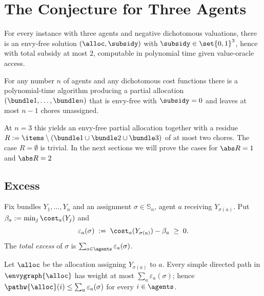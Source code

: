\section{The Conjecture for Three Agents}
\label{sec:n3}


\begin{theorem}
\label{thm:n3-main}
For every instance with three agents and negative dichotomous valuations, there
is an envy-free solution $(\alloc, \subsidy)$ with $\subsidy \in \set{0,1}^3$,
hence with total subsidy at most $2$, computable in polynomial time given
value-oracle access.
\end{theorem}


\begin{theorem}
\label{thm:n3-twyz}
For any number $n$ of agents and any dichotomous cost functions there is a
polynomial-time algorithm producing a partial allocation
$(\bundle1,\dots,\bundle n)$ that is envy-free with $\subsidy = 0$ and leaves
at most $n-1$ chores unassigned.
\end{theorem}

At $n = 3$ this yields an envy-free partial allocation together with a residue
$R := \items \setminus (\bundle1 \cup \bundle2 \cup \bundle3)$ of at most two
chores. The case $R = \emptyset$ is trivial.
In the next sections we will prove the cases for $ \abs R = 1 $ and $\abs R = 2$

\subsection{Excess}
\label{sec:n3-excess}

\begin{definition}[Excess]
\label{def:n3-excess}
Fix bundles $Y_1,\dots,Y_n$ and an assignment $\sigma \in \mathbb{S}_n$, agent
$a$ receiving $Y_{\sigma(a)}$. Put $\beta_a := \min_{j} \cost_a(Y_j)$ and
\[
  \varepsilon_a(\sigma) \;:=\; \cost_a(Y_{\sigma(a)}) - \beta_a \;\ge\; 0 .
\]
The \emph{total excess} of $\sigma$ is $\sum_{a \in \agents}
\varepsilon_a(\sigma)$.
\end{definition}

\begin{lemma}
\label{lem:n3-pathbound}
Let $\alloc$ be the allocation assigning $Y_{\sigma(a)}$ to $a$. Every simple
directed path in $\envygraph{\alloc}$ has weight at most $\sum_a
\varepsilon_a(\sigma)$; hence $\pathw{\alloc}(i) \le \sum_a
\varepsilon_a(\sigma)$ for every $i \in \agents$.
\end{lemma}

